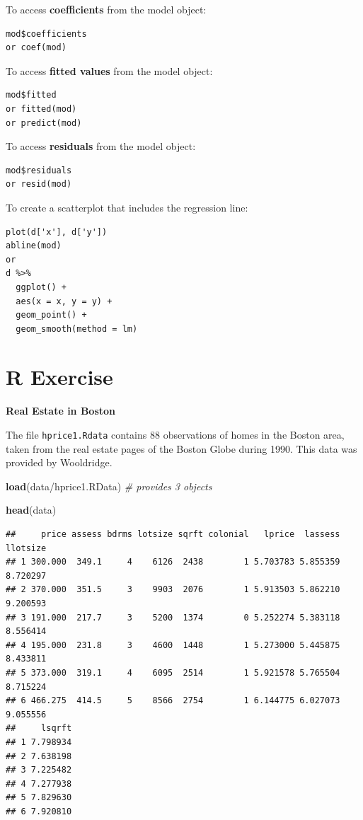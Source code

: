 \documentclass[
]{book}
\newenvironment{Shaded}{\begin{snugshade}}{\end{snugshade}}
\newcommand{\CommentTok}[1]{\textcolor[rgb]{0.56,0.35,0.01}{\textit{#1}}}
\newcommand{\FunctionTok}[1]{\textcolor[rgb]{0.13,0.29,0.53}{\textbf{#1}}}
\newcommand{\NormalTok}[1]{#1}
\newcommand{\StringTok}[1]{\textcolor[rgb]{0.31,0.60,0.02}{#1}}
\theoremstyle{definition}
\theoremstyle{definition}
\theoremstyle{definition}
\theoremstyle{definition}
\theoremstyle{remark}
\begin{document}
To access \textbf{coefficients} from the model object:

\begin{verbatim}
mod$coefficients
or coef(mod)
\end{verbatim}

To access \textbf{fitted values} from the model object:

\begin{verbatim}
mod$fitted
or fitted(mod)
or predict(mod)
\end{verbatim}

To access \textbf{residuals} from the model object:

\begin{verbatim}
mod$residuals
or resid(mod)
\end{verbatim}

To create a scatterplot that includes the regression line:

\begin{verbatim}
plot(d['x'], d['y'])
abline(mod)
or 
d %>% 
  ggplot() + 
  aes(x = x, y = y) + 
  geom_point() + 
  geom_smooth(method = lm)
\end{verbatim}

\section{R Exercise}\label{r-exercise}

\textbf{Real Estate in Boston}

The file \texttt{hprice1.Rdata} contains 88 observations of homes in the Boston area, taken from the real estate pages of the Boston Globe during 1990. This data was provided by Wooldridge.

\begin{Shaded}
\begin{Highlighting}[]
\FunctionTok{load}\NormalTok{(}\StringTok{\textquotesingle{}data/hprice1.RData\textquotesingle{}}\NormalTok{) }\CommentTok{\# provides 3 objects }
\end{Highlighting}
\end{Shaded}

\begin{Shaded}
\begin{Highlighting}[]
\FunctionTok{head}\NormalTok{(data)}
\end{Highlighting}
\end{Shaded}

\begin{verbatim}
##     price assess bdrms lotsize sqrft colonial   lprice  lassess llotsize
## 1 300.000  349.1     4    6126  2438        1 5.703783 5.855359 8.720297
## 2 370.000  351.5     3    9903  2076        1 5.913503 5.862210 9.200593
## 3 191.000  217.7     3    5200  1374        0 5.252274 5.383118 8.556414
## 4 195.000  231.8     3    4600  1448        1 5.273000 5.445875 8.433811
## 5 373.000  319.1     4    6095  2514        1 5.921578 5.765504 8.715224
## 6 466.275  414.5     5    8566  2754        1 6.144775 6.027073 9.055556
##     lsqrft
## 1 7.798934
## 2 7.638198
## 3 7.225482
## 4 7.277938
## 5 7.829630
## 6 7.920810
\end{verbatim}
\end{document}
